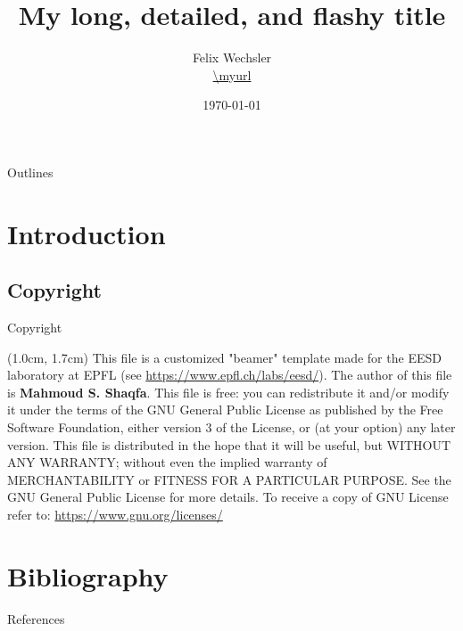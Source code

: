 \documentclass[aspectratio=54]{LAPD}
\author[\myurl]{Felix Wechsler\\\url{\myurl}}
\title[Your tiny title here]{My long, detailed, and flashy title}
\institute[ENAC]{{\'Ecole Polytechnique F\'ed\'erale de Lausanne (EPFL)}{\newline\newline Laboratory of Applied Photonics Devices (LAPD)}}
\date{\today}
\begin{document}
{ %
\usebackgroundtemplate{} %
} %




\begin{frame}{Outlines}
\begin{multicols}{2}
\tableofcontents
\end{multicols}
\end{frame}

\section{Introduction}

\subsection{Copyright}
\begin{frame}[t]{Copyright}
\begin{textblock*}{11cm}(1.0cm,  1.7cm)
    {\selectfont
    This file is a customized "beamer" template made for the EESD laboratory at EPFL (see \href{https://www.epfl.ch/labs/eesd/}{https://www.epfl.ch/labs/eesd/}). The author of this file is \textbf{Mahmoud S. Shaqfa}. This file is free: you can redistribute it and/or modify it under the terms of the GNU General Public License as published by    the Free Software Foundation, either version 3 of the License, or (at your option) any later version. This file is distributed in the hope that it will be useful, but WITHOUT ANY WARRANTY; without even the implied warranty of MERCHANTABILITY or FITNESS FOR A PARTICULAR PURPOSE.  See the GNU General Public License for more details. To receive a copy of GNU License refer to: \href{https://www.gnu.org/licenses/}{https://www.gnu.org/licenses/}
    }
\end{textblock*}
\end{frame}


\section{Bibliography}
\begin{frame}{References}\vspace{4pt}
\tiny{\printbibliography}
\end{frame}
\normalsize
\end{document}
